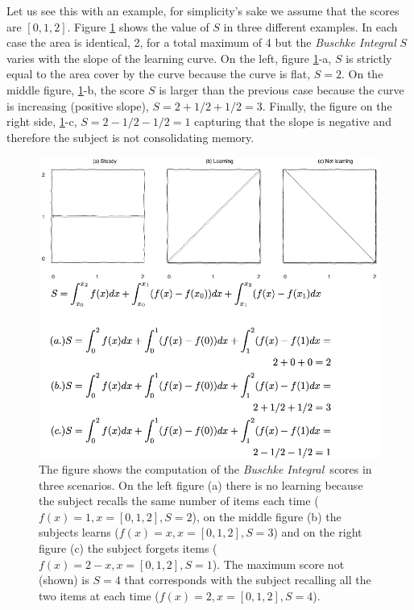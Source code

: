 \documentclass[11pt]{article}
\theoremstyle{definition}
\theoremstyle{remark}
\begin{document}
Let us see this with an example, for simplicity's sake we assume that the scores are $[0,1,2]$. Figure \ref{fig:b} shows the value of $S$ in three different examples. In each case the area is identical, 2, for a total maximum of 4 but the \emph{Buschke Integral} $S$ varies with the slope of the learning curve. On the left, figure \ref{fig:b}-a,
$S$ is strictly equal to the area cover by the curve because the curve is flat, $S=2$. On the middle figure, \ref{fig:b}-b, the score $S$ is larger than the previous case because the curve is increasing (positive slope), $S=2+1/2+1/2=3$. Finally, the figure on the right side, \ref{fig:b}-c, $S=2-1/2-1/2=1$ capturing that the slope is negative and therefore the subject is not consolidating memory.      
  
\begin{figure}[H]
        \centering
        \includegraphics[keepaspectratio, width=\linewidth]{figures/fig_buschkewitheqs}
        \caption{The figure shows the computation of the \emph{Buschke Integral} scores in three scenarios. On the left figure (a) there is no learning because the subject recalls the same number of items each time ($f(x)=1, x=[0,1,2], S=2$), on the middle figure (b) the subjects learns ($f(x)=x, x=[0,1,2], S=3$) and on the right figure (c) the subject forgets items ($f(x)=2-x, x=[0,1,2], S=1$). The maximum score not (shown) is $S=4$ that corresponds with the subject recalling all the two items at each time ($f(x)=2, x=[0,1,2], S=4$).} 
        \label{fig:b}
\end{figure}
\end{document}
